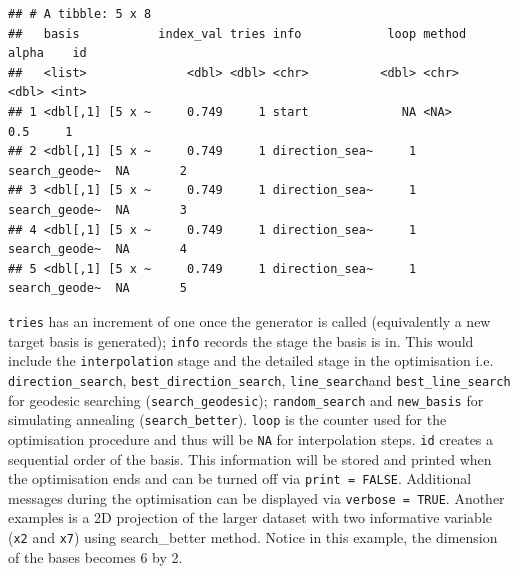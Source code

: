 \documentclass[12pt]{article}
\newenvironment{Shaded}{\begin{snugshade}}{\end{snugshade}}
\newcommand{\DecValTok}[1]{\textcolor[rgb]{0.00,0.00,0.81}{#1}}
\newcommand{\KeywordTok}[1]{\textcolor[rgb]{0.13,0.29,0.53}{\textbf{#1}}}
\newcommand{\NormalTok}[1]{#1}
\newcommand{\OperatorTok}[1]{\textcolor[rgb]{0.81,0.36,0.00}{\textbf{#1}}}
\newcommand{\StringTok}[1]{\textcolor[rgb]{0.31,0.60,0.02}{#1}}
\begin{document}
\begin{Shaded}
\end{Shaded}

\begin{verbatim}
## # A tibble: 5 x 8
##   basis           index_val tries info            loop method        alpha    id
##   <list>              <dbl> <dbl> <chr>          <dbl> <chr>         <dbl> <int>
## 1 <dbl[,1] [5 x ~     0.749     1 start             NA <NA>            0.5     1
## 2 <dbl[,1] [5 x ~     0.749     1 direction_sea~     1 search_geode~  NA       2
## 3 <dbl[,1] [5 x ~     0.749     1 direction_sea~     1 search_geode~  NA       3
## 4 <dbl[,1] [5 x ~     0.749     1 direction_sea~     1 search_geode~  NA       4
## 5 <dbl[,1] [5 x ~     0.749     1 direction_sea~     1 search_geode~  NA       5
\end{verbatim}

\texttt{tries} has an increment of one once the generator is called
(equivalently a new target basis is generated); \texttt{info} records
the stage the basis is in. This would include the \texttt{interpolation}
stage and the detailed stage in the optimisation i.e.
\texttt{direction\_search}, \texttt{best\_direction\_search},
\texttt{line\_search}and \texttt{best\_line\_search} for geodesic
searching (\texttt{search\_geodesic}); \texttt{random\_search} and
\texttt{new\_basis} for simulating annealing (\texttt{search\_better}).
\texttt{loop} is the counter used for the optimisation procedure and
thus will be \texttt{NA} for interpolation steps. \texttt{id} creates a
sequential order of the basis. This information will be stored and
printed when the optimisation ends and can be turned off via
\texttt{print\ =\ FALSE}. Additional messages during the optimisation
can be displayed via \texttt{verbose\ =\ TRUE}. Another examples is a 2D
projection of the larger dataset with two informative variable
(\texttt{x2} and \texttt{x7}) using search\_better method. Notice in
this example, the dimension of the bases becomes 6 by 2.

\begin{Shaded}
\end{Shaded}
\end{document}
